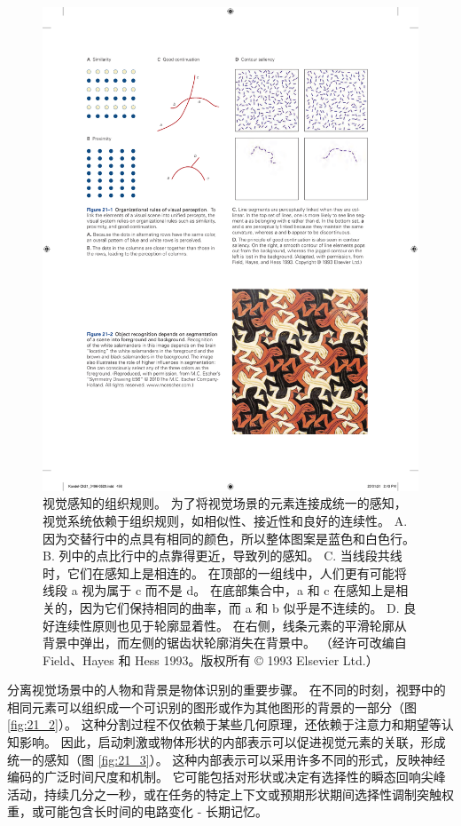 \begin{figure}[htbp]
	\centering
	\includegraphics[width=1.0\linewidth]{chap21/fig_21_1}
	\caption{视觉感知的组织规则。 
		为了将视觉场景的元素连接成统一的感知，视觉系统依赖于组织规则，如相似性、接近性和良好的连续性。 
		A. 因为交替行中的点具有相同的颜色，所以整体图案是蓝色和白色行。 
		B. 列中的点比行中的点靠得更近，导致列的感知。 
		C. 当线段共线时，它们在感知上是相连的。 
		在顶部的一组线中，人们更有可能将线段 a 视为属于 c 而不是 d。 
		在底部集合中，a 和 c 在感知上是相关的，因为它们保持相同的曲率，而 a 和 b 似乎是不连续的。 
		D. 良好连续性原则也见于轮廓显着性。 
		在右侧，线条元素的平滑轮廓从背景中弹出，而左侧的锯齿状轮廓消失在背景中。 （经许可改编自 Field、Hayes 和 Hess 1993。版权所有 © 1993 Elsevier Ltd.）}
	\label{fig:21_1}
\end{figure}


分离视觉场景中的人物和背景是物体识别的重要步骤。 
在不同的时刻，视野中的相同元素可以组织成一个可识别的图形或作为其他图形的背景的一部分（图 \ref{fig:21_2}）。 
这种分割过程不仅依赖于某些几何原理，还依赖于注意力和期望等认知影响。
因此，启动刺激或物体形状的内部表示可以促进视觉元素的关联，形成统一的感知（图 \ref{fig:21_3}）。 
这种内部表示可以采用许多不同的形式，反映神经编码的广泛时间尺度和机制。 
它可能包括对形状或决定有选择性的瞬态回响尖峰活动，持续几分之一秒，或在任务的特定上下文或预期形状期间选择性调制突触权重，或可能包含长时间的电路变化 - 长期记忆。


